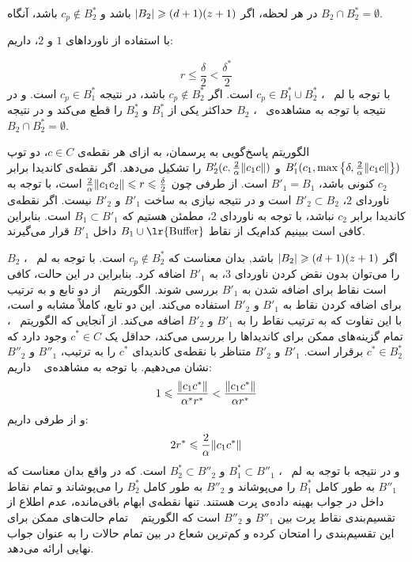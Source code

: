  در هر لحظه، اگر $\left|{B_2}\right| \geqslant (d+1)(z+1)$ باشد و $c_p \not \in B_2^*$ باشد، آنگاه $B_2 \cap B_2^* = \emptyset$.
 
 
 با استفاده از‌ ناورداهای $1$ و $2$، داریم:
 
$$r \leq \frac{\delta}{2} < \frac{\delta^*}{2}$$
 با توجه با لم ~، $c_p \in B_1^* \cup B_2^*$ است.
 اگر $c_p \not \in B_2^*$ باشد، در نتیجه $c_p \in B_1^*$ است.
 و در نتیجه با توجه به مشاهده‌ی ~، $B_2$ حداکثر یکی از $B_1^*$ و $B_2^*$ را قطع می‌کند و در نتیجه $B_2 \cap B_2^* = \emptyset$.
 


الگوریتم پاسخ‌گویی به پرسمان، به ازای هر نقطه‌ی $c \in C$، دو توپ 
$B_1'(c_1, \max \left\{ \delta, \frac{2}{\alpha} \|{c_1 c}\| \right\})$ و 
$B_2'(c, \frac{2}{\alpha} \|{c_1 c}\|)$
را تشکیل می‌دهد. 
اگر نقطه‌ی کاندیدا برابر $c_2$ کنونی باشد، $B'_1 = B_1$ است.
از طرفی چون $\frac{2}{\alpha}\|{c_1 c_2}\| \leqslant r \leqslant \frac{\delta}{2}$ است، با توجه به ناوردای $2$، $B'_2 \subset B_2$ است و در نتیجه نیازی به ساخت $B'_1$ و $B'_2$ نیست.
 اگر نقطه‌ی کاندیدا برابر $c_2$ نباشد، با توجه به ناوردای $2$، مطمئن هستیم که $B_1 \subset B'_1$ است. 
 بنابراین کافی است ببینیم کدام‌یک از نقاط $B_1 \cup \text{\lr{Buffer}}$ داخل $B'_1$ قرار می‌گیرند.
 
 اگر $\left|{B_2}\right| \geqslant (d+1)(z+1)$ باشد, بدان معناست که $c_p \not \in B_2^*$ است.
 با توجه به لم ~، $B_2$ را می‌توان بدون نقض کردن ناوردای $3$، به $B'_1$ اضافه کرد.
بنابراین در این حالت، کافی است نقاط  برای اضافه شدن به $B'_1$ بررسی شوند.
الگوریتم ~ از دو تابع  و  به ترتیب برای اضافه کردن نقاط به $B'_1$ و $B'_2$ استفاده می‌کند.
این دو تابع، کاملاً مشابه  و  است، با این تفاوت که به ترتیب نقاط را به $B'_1$ و $B'_2$ اضافه می‌کند.
از آنجایی که الگوریتم ~، تمام گزینه‌های ممکن برای کاندیداها را بررسی می‌کند، حداقل یک $c^* \in C$ وجود دارد که $c^* \in B_2^*$ برقرار است.
$B'_1$ و $B'_2$
 متناظر با نقطه‌ی کاندیدای $c^*$ را به ترتیب، $B''_1$ و $B''_2$ نشان می‌دهیم.
 با توجه به مشاهده‌ی ~ داریم:
 $$1 \leqslant \frac{\|{c_1 c^*}\|}{\alpha^* r^*} < \frac{\|{c_1 c^*}\|}{\alpha r^*}$$
 و از طرفی داریم:
 $$2r^* \leqslant \frac{2}{\alpha} \|{c_1 c^*}\|$$
 و در نتیجه با توجه به لم ~،
 $B_1^* \subset B''_1$ و $B_2^* \subset B''_2$
 است.
 که در واقع بدان معناست که $B''_1$ به طور کامل $B_1^*$ را می‌پوشاند و $B''_2$ به طور کامل $B_2^*$ را می‌پوشاند و تمام نقاط داخل  در جواب بهینه داده‌ی پرت هستند.
 تنها نقطه‌ی ابهام باقی‌مانده، عدم اطلاع از تقسیم‌بندی نقاط پرت بین $B''_1$ و $B''_2$ است که الگوریتم ~ تمام حالت‌های ممکن برای این تقسیم‌بندی را امتحان کرده و کم‌ترین شعاع در بین تمام حالات را به عنوان جواب نهایی ارائه می‌دهد.
 
